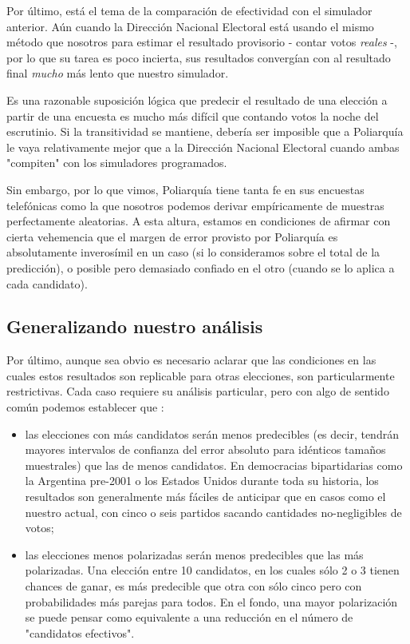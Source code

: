 \documentclass[12pt, a4paper]{article}
\begin{document}
Por \'ultimo, est\'a el tema de la comparaci\'on de efectividad con el simulador anterior. A\'un cuando la Direcci\'on Nacional Electoral est\'a usando el mismo m\'etodo que nosotros para estimar el resultado provisorio - contar votos \emph{reales} -, por lo que su tarea es poco incierta, sus resultados converg\'ian con al resultado final \emph{mucho} m\'as lento que nuestro simulador.

Es una razonable suposici\'on l\'ogica que predecir el resultado de una elecci\'on a partir de una encuesta es mucho m\'as dif\'icil que contando votos la noche del escrutinio. Si la transitividad se mantiene, deber\'ia ser imposible que a Poliarqu\'ia le vaya relativamente mejor que a la Direcci\'on Nacional Electoral cuando ambas "compiten" con los simuladores programados.

Sin embargo, por lo que vimos, Poliarqu\'ia tiene tanta fe en sus encuestas telef\'onicas como la que nosotros podemos derivar emp\'iricamente de muestras perfectamente aleatorias. A esta altura, estamos en condiciones de afirmar con cierta vehemencia que el margen de error provisto por Poliarqu\'ia es absolutamente inveros\'imil en un caso (si lo consideramos sobre el total de la predicci\'on), o posible pero demasiado confiado en el otro (cuando se lo aplica a cada candidato).

\subsection{Generalizando nuestro an\'alisis}

Por \'ultimo, aunque sea obvio es necesario aclarar que las condiciones en las cuales estos resultados son replicable para otras elecciones, son particularmente restrictivas. Cada caso requiere su an\'alisis particular, pero con algo de sentido com\'un podemos establecer que :
\begin{center}
	\begin{itemize}
		\item las elecciones con m\'as candidatos ser\'an menos predecibles (es decir, tendr\'an mayores intervalos de confianza del error absoluto para id\'enticos tama\~nos muestrales) que las de menos candidatos. En democracias bipartidarias como la Argentina pre-2001 o los Estados Unidos durante toda su historia, los resultados son generalmente m\'as f\'aciles de anticipar que en casos como el nuestro actual, con cinco o seis partidos sacando cantidades no-negligibles de votos;
		\item las elecciones menos polarizadas ser\'an menos predecibles que las m\'as polarizadas. Una elecci\'on entre 10 candidatos, en los cuales s\'olo 2 o 3 tienen chances de ganar, es m\'as predecible que otra con s\'olo cinco pero con probabilidades m\'as parejas para todos. En el fondo, una mayor polarizaci\'on se puede pensar como equivalente a una reducci\'on en el n\'umero de "candidatos efectivos".
		\end{itemize}
	\end{center}
\end{document}
